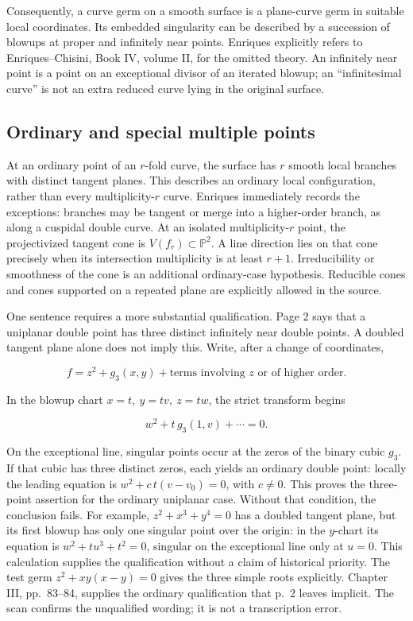 Consequently, a curve germ on a smooth surface is a plane-curve germ in suitable local coordinates. Its embedded singularity can be described by a succession of blowups at proper and infinitely near points. Enriques explicitly refers to Enriques--Chisini, Book IV, volume II, for the omitted theory. An infinitely near point is a point on an exceptional divisor of an iterated blowup; an ``infinitesimal curve'' is not an extra reduced curve lying in the original surface.

\subsection{Ordinary and special multiple points}

At an ordinary point of an \(r\)-fold curve, the surface has \(r\) smooth local branches with distinct tangent planes. This describes an ordinary local configuration, rather than every multiplicity-\(r\) curve. Enriques immediately records the exceptions: branches may be tangent or merge into a higher-order branch, as along a cuspidal double curve. At an isolated multiplicity-\(r\) point, the projectivized tangent cone is \(V(f_r)\subset\mathbb P^2\). A line direction lies on that cone precisely when its intersection multiplicity is at least \(r+1\). Irreducibility or smoothness of the cone is an additional ordinary-case hypothesis. Reducible cones and cones supported on a repeated plane are explicitly allowed in the source.

One sentence requires a more substantial qualification. Page 2 says that a uniplanar double point has three distinct infinitely near double points. A doubled tangent plane alone does not imply this. Write, after a change of coordinates,

\[
f=z^2+g_3(x,y)+\text{terms involving }z\text{ or of higher order}.
\]

In the blowup chart \(x=t,\ y=tv,\ z=tw\), the strict transform begins

\[
w^2+t\,g_3(1,v)+\cdots=0.
\]

On the exceptional line, singular points occur at the zeros of the binary cubic \(g_3\). If that cubic has three distinct zeros, each yields an ordinary double point: locally the leading equation is \(w^2+c\,t(v-v_0)=0\), with \(c\ne0\). This proves the three-point assertion for the ordinary uniplanar case. Without that condition, the conclusion fails. For example, \(z^2+x^3+y^4=0\) has a doubled tangent plane, but its first blowup has only one singular point over the origin: in the \(y\)-chart its equation is \(w^2+t u^3+t^2=0\), singular on the exceptional line only at \(u=0\). This calculation supplies the qualification without a claim of historical priority. The test germ \(z^2+xy(x-y)=0\) gives the three simple roots explicitly. Chapter III, pp.~83--84, supplies the ordinary qualification that p.~2 leaves implicit. The scan confirms the unqualified wording; it is not a transcription error.

